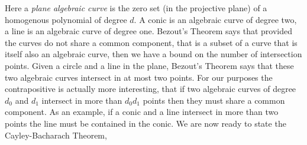 \documentclass[
10pt, %
a4paper, %
oneside, %
headinclude,footinclude, %
BCOR5mm, %
]{scrartcl}
\begin{document}
Here a \textit{plane algebraic curve} is the zero set (in the projective plane) of a homogenous polynomial of degree \(d\). A conic is an algebraic curve of degree two, a line is an algebraic curve of degree one. Bezout's Theorem says that provided the curves do not share a common component, that is a subset of a curve that is itself also an algebraic curve, then we have a bound on the number of intersection points.
Given a circle and a line in the plane, Bezout's Theorem says that these two algebraic curves intersect in at most two points. For our purposes the contrapositive is actually more interesting, that if two algebraic curves of degree \(d_{0}\) and \(d_{1}\) intersect in more than \(d_{0} d_{1}\) points then they must share a common component.
As an example, if a conic and a line intersect in more than two points the line must be contained in the conic. We are now ready to state the Cayley-Bacharach Theorem,
\end{document}
